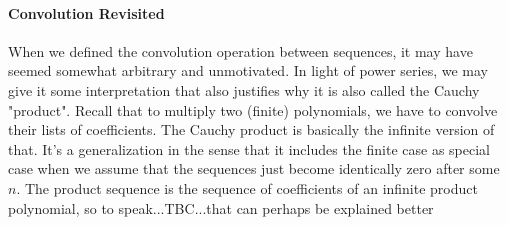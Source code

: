 




\paragraph{Convolution Revisited}
When we defined the convolution operation between sequences, it may have seemed somewhat arbitrary and unmotivated. In light of power series, we may give it some interpretation that also justifies why it is also called the Cauchy "product". Recall that to multiply two (finite) polynomials, we have to convolve their lists of coefficients. The Cauchy product is basically the infinite version of that. It's a generalization in the sense that it includes the finite case as special case when we assume that the sequences just become identically zero after some $n$. The product sequence is the sequence of coefficients of an infinite product polynomial, so to speak...TBC...that can perhaps be explained better





